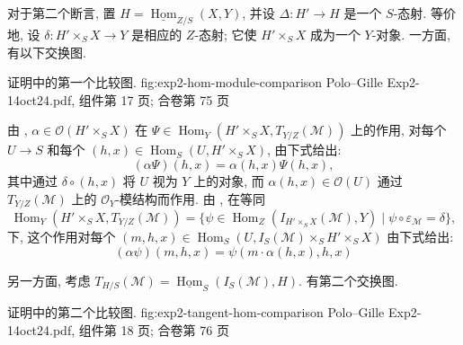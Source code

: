 对于第二个断言, 置
\(H=\underline{\operatorname{Hom}}_{Z/S}(X,Y)\), 并设
\(\Delta:H'\to H\) 是一个 \(S\)-态射.
等价地, 设 \(\delta:H'\times_SX\to Y\) 是相应的 \(Z\)-态射;
它使 \(H'\times_SX\) 成为一个 \(Y\)-对象.
一方面, 有以下交换图.

  { 证明中的第一个比较图.}
  {fig:exp2-hom-module-comparison}
  {Polo--Gille Exp2-14oct24.pdf, 组件第 17 页; 合卷第 75 页}

由 ,
\(\alpha\in\mathcal O(H'\times_SX)\) 在
\(\Psi\in\operatorname{Hom}_Y(H'\times_SX,T_{Y/Z}(\mathcal M))\)
上的作用, 对每个 \(U\to S\) 和每个
\((h,x)\in\operatorname{Hom}_S(U,H'\times_SX)\), 由下式给出:
\[
  (\alpha\Psi)(h,x)=\alpha(h,x)\Psi(h,x),
\]
其中通过 \(\delta\circ(h,x)\) 将 \(U\) 视为 \(Y\) 上的对象,
而 \(\alpha(h,x)\in\mathcal O(U)\) 通过
\(T_{Y/Z}(\mathcal M)\) 上的 \(\mathcal O_Y\)-模结构而作用.
由 , 在等同
\[
  \operatorname{Hom}_Y(H'\times_SX,T_{Y/Z}(\mathcal M))
  =\{\psi\in\operatorname{Hom}_Z(I_{H'\times_SX}(\mathcal M),Y)
       \mid\psi\circ\varepsilon_{\mathcal M}=\delta\},
\]
下, 这个作用对每个
\((m,h,x)\in\operatorname{Hom}_S
  (U,I_S(\mathcal M)\times_SH'\times_SX)\)
由下式给出:
\begin{equation}
  (\alpha\psi)(m,h,x)
  =\psi(m\cdot\alpha(h,x),h,x)
  \tag{1}\label{sga3:ii:subsection:3-9-0:equation:1}
\end{equation}

另一方面, 考虑
\(T_{H/S}(\mathcal M)=\underline{\operatorname{Hom}}_S
  (I_S(\mathcal M),H)\). 有第二个交换图.

  { 证明中的第二个比较图.}
  {fig:exp2-tangent-hom-comparison}
  {Polo--Gille Exp2-14oct24.pdf, 组件第 18 页; 合卷第 76 页}


